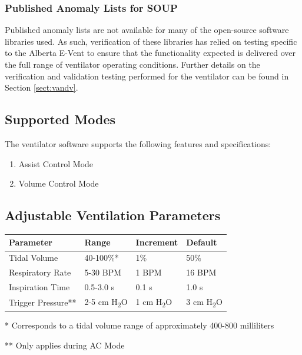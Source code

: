 \documentclass[]{article}
\begin{document}
\subsubsection{Published Anomaly Lists for SOUP}
Published anomaly lists are not available for many of the open-source software libraries used.  As such, verification of these libraries has relied on testing specific to the Alberta E-Vent to ensure that the functionality expected is delivered over the full range of ventilator operating conditions.  Further details on the verification and validation testing performed for the ventilator can be found in Section \ref{sect:vandv}.



\subsection{Supported Modes}

The ventilator software supports the following features and specifications:
\begin{enumerate}
	\item Assist Control Mode
	\item Volume Control Mode
\end{enumerate}


\subsection{Adjustable Ventilation Parameters}
\label{Sec:Ventilation Parameters}


\begin{center}
	\begin{table}[h]
		
	
	\begin{tabular}{ |p{4.3cm}| p{3cm}| p{3cm}|p{3cm}|}
		\hline
		\textbf{Parameter} & \textbf{Range} & \textbf{Increment}& \textbf{Default} \\
		\hline 
		Tidal Volume & 40-100\%* & 1\% & 50\% \\  
		\hline
		Respiratory Rate & 5-30 BPM  & 1 BPM & 16 BPM \\ 
		\hline   
		Inspiration Time & 0.5-3.0 s& 0.1 s & 1.0 s\\
		\hline
		Trigger Pressure** & 2-5 cm H\textsubscript{2}O & 1 cm H\textsubscript{2}O& 3 cm H\textsubscript{2}O \\
		\hline
	\end{tabular}


* Corresponds to a tidal volume range of approximately 400-800 milliliters

** Only applies during AC Mode
\end{table}
	
\end{center}
\end{document}
